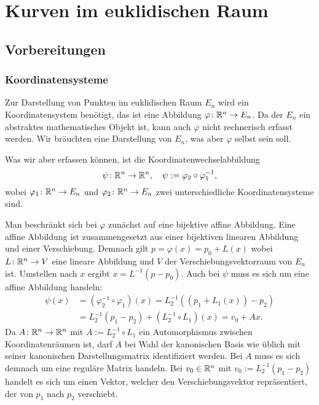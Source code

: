 

\chapter{Kurven im euklidischen Raum}

\section{Vorbereitungen}

\subsection{Koordinatensysteme}\label{section:Koordinatensysteme}

Zur Darstellung von Punkten im euklidischen Raum $E_n$ wird ein
Koordinatensystem benötigt, das ist eine Abbildung
$\varphi\colon\mathbb R^n\to E_n$. Da der $E_n$ ein abstraktes mathematisches
Objekt ist, kann auch $\varphi$ nicht rechnerisch erfasst werden.
Wir bräuchten eine Darstellung von $E_n$, was aber $\varphi$ selbst
sein soll.

Was wir aber erfassen können, ist die Koordinatenwechselabbildung%
\begin{equation}
\psi\colon\mathbb R^n\to\mathbb R^n,\quad \psi := \varphi_2\circ\varphi_1^{-1},
\end{equation}
wobei $\varphi_1\colon\mathbb R^n\to E_n$ und $\varphi_2\colon\mathbb R^n\to E_n$
zwei unterschiedliche Koordinatensysteme sind.

Man beschränkt sich bei $\varphi$ zunächst
auf eine bijektive affine Abbildung. Eine affine Abbildung ist
zusammengesetzt aus einer bijektiven linearen Abbildung und einer
Verschiebung. Demnach gilt $p=\varphi(x) = p_0+L(x)$ wobei
$L\colon\mathbb R^n\to V$ eine lineare Abbildung und $V$ der
Verschiebungsvektorraum von $E_n$ ist. Umstellen nach $x$ ergibt
$x=L^{-1}(p-p_0)$. Auch bei $\psi$ muss es sich um eine affine
Abbildung handeln:%
\begin{align}
\psi(x) &= (\varphi_2^{-1}\circ\varphi_1)(x)= L_2^{-1}((p_1+L_1(x))-p_2)\\
&= L_2^{-1}(p_1-p_2)+(L_2^{-1}\circ L_1)(x) = v_0+Ax.
\end{align}
Da $A\colon\mathbb R^n\to\mathbb R^n$ mit $A:=L_2^{-1}\circ L_1$ ein Automorphismus
zwischen Koordinatenräumen ist, darf $A$ bei Wahl der kanonischen Basis
wie üblich mit seiner kanonischen Darstellungsmatrix identifiziert
werden. Bei $A$ muss es sich demnach um eine reguläre Matrix handeln.
Bei $v_0\in\mathbb R^n$ mit
$v_0:=L_2^{-1}(p_1-p_2)$ handelt es sich um einen Vektor, welcher den
Verschiebungsvektor repräsentiert, der von $p_1$ nach $p_2$ verschiebt.


